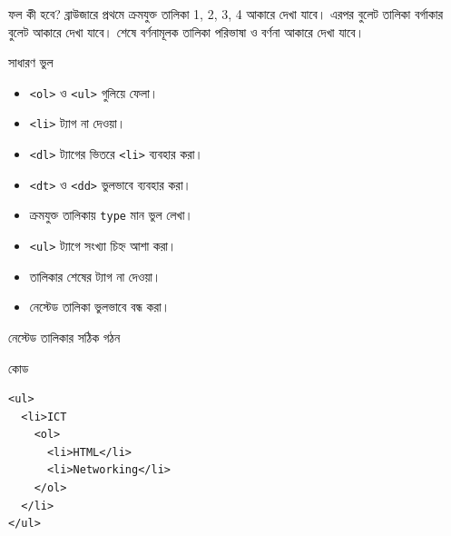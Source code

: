 \begin{examplebox}{ফল কী হবে?}
ব্রাউজারে প্রথমে ক্রমযুক্ত তালিকা 1, 2, 3, 4 আকারে দেখা যাবে। এরপর বুলেট তালিকা বর্গাকার বুলেট আকারে দেখা যাবে। শেষে বর্ণনামূলক তালিকা পরিভাষা ও বর্ণনা আকারে দেখা যাবে।
\end{examplebox}


\begin{mistakebox}{সাধারণ ভুল}
\par\noindent
\begin{minipage}[t]{.48\linewidth}\vspace{0pt}
\begin{itemize}
\item \texttt{<ol>} ও \texttt{<ul>} গুলিয়ে ফেলা।
\item \texttt{<li>} ট্যাগ না দেওয়া।
\item \texttt{<dl>} ট্যাগের ভিতরে \texttt{<li>} ব্যবহার করা।
\item \texttt{<dt>} ও \texttt{<dd>} ভুলভাবে ব্যবহার করা।
\end{itemize}
\end{minipage}\hfill
\begin{minipage}[t]{.48\linewidth}\vspace{0pt}
\begin{itemize}
\item ক্রমযুক্ত তালিকায় \texttt{type} মান ভুল লেখা।
\item \texttt{<ul>} ট্যাগে সংখ্যা চিহ্ন আশা করা।
\item তালিকার শেষের ট্যাগ না দেওয়া।
\item নেস্টেড তালিকা ভুলভাবে বন্ধ করা।
\end{itemize}
\end{minipage}\par

\end{mistakebox}

\begin{boardbox}{নেস্টেড তালিকার সঠিক গঠন}
\begin{examplebox}{কোড}
\par\noindent\begin{minipage}{\linewidth}
\begin{verbatim}
<ul>
  <li>ICT
    <ol>
      <li>HTML</li>
      <li>Networking</li>
    </ol>
  </li>
</ul>
\end{verbatim}
\end{minipage}\par
\end{examplebox}
\end{boardbox}

